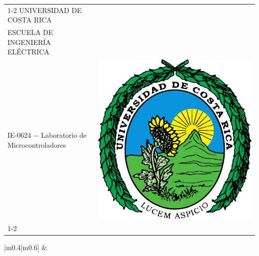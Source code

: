 \documentclass[12pt,a4paper]{article}
\begin{document}
 

\begin{table}[H]
    \centering
    \begin{tabular} {|m{}|m{}|}
      \cline{1-2}
        \centering
        \vspace{0.2cm}
        UNIVERSIDAD DE COSTA RICA \\ \vspace{0.2cm}
         ESCUELA DE INGENIERÍA ELÉCTRICA \\ \vspace{0.2cm}
         IE-0624 $-$ Laboratorio de Microcontroladores \vspace{0.2cm}
        &
        \includegraphics[width=\linewidth]{IMG/Imagen1.png}\\
      \cline{1-2}
    \end{tabular}
    
    \begin{tabular} {|m{}|m{}|}
        &
         \\
        

    \end{tabular}
\end{table}
\end{document}
